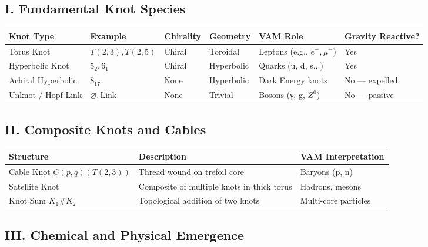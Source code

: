 \documentclass[12pt]{article}
\begin{document}
\subsection*{I. Fundamental Knot Species}
\begin{center}
    \footnotesize
    \begin{tabular}{|l|l|l|l|l|l|}
        \hline
        \textbf{Knot Type} & \textbf{Example} & \textbf{Chirality} & \textbf{Geometry} & \textbf{VAM Role} & \textbf{Gravity Reactive?} \\
        \hline
        Torus Knot & \( T(2,3), T(2,5) \) & Chiral & Toroidal & Leptons (e.g., \( e^-, \mu^- \)) & Yes \\
        Hyperbolic Knot & \( 5_2, 6_1 \) & Chiral & Hyperbolic & Quarks (u, d, s...) & Yes \\
        Achiral Hyperbolic & \( 8_{17} \) & None & Hyperbolic & Dark Energy knots & No — expelled \\
        Unknot / Hopf Link & \( \varnothing, \text{Link} \) & None & Trivial & Bosons (γ, g, \( Z^0 \)) & No — passive \\
        \hline
    \end{tabular}
\end{center}

\subsection*{II. Composite Knots and Cables}
\begin{center}
    \footnotesize
    \begin{tabular}{|l|p{8cm}|l|}
        \hline
        \textbf{Structure} & \textbf{Description} & \textbf{VAM Interpretation} \\
        \hline
        Cable Knot \( C(p,q)(T(2,3)) \) & Thread wound on trefoil core & Baryons (p, n) \\
        Satellite Knot & Composite of multiple knots in thick torus & Hadrons, mesons \\
        Knot Sum \( K_1 \# K_2 \) & Topological addition of two knots & Multi-core particles \\
        \hline
    \end{tabular}
\end{center}

\subsection*{III. Chemical and Physical Emergence}
\end{document}
